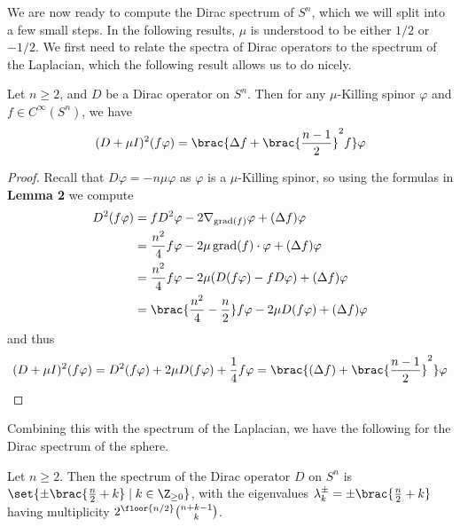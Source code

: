 \documentclass[11pt]{report}
\DeclareMathOperator{\grad}{grad}
\begin{document}
We are now ready to compute the Dirac spectrum of $S^n$, which we will split into a few small steps. In the following results, $\mu$ is understood to be either $1/2$ or $-1/2$. We first need to relate the spectra of Dirac operators to the spectrum of the Laplacian, which the following result allows us to do nicely.
\begin{lemma}
    Let $n \geq 2$, and $D$ be a Dirac operator on $S^n$. Then for any $\mu$-Killing spinor $\varphi$ and $f \in C^\infty(S^n)$, we have
    $$
        (D + \mu I)^2(f\varphi) = \brac{\Delta f + \brac{\frac{n - 1}{2}}^2 f}\varphi
    $$
\end{lemma}
\begin{proof}
    Recall that $D\varphi = -n\mu\varphi$ as $\varphi$ is a $\mu$-Killing spinor, so using the formulas in \textbf{Lemma 2} we compute
    \begin{align*}
        D^2(f\varphi) &= fD^2\varphi - 2\nabla_{\grad(f)}\varphi + (\Delta f)\varphi \\
        &= \frac{n^2}{4}f\varphi - 2\mu \grad(f) \cdot \varphi + (\Delta f)\varphi \\
        &= \frac{n^2}{4}f\varphi - 2\mu(D(f\varphi) - fD\varphi) + (\Delta f)\varphi \\
        &= \brac{\frac{n^2}{4} - \frac{n}{2}}f\varphi - 2\mu D(f\varphi) + (\Delta f)\varphi
    \end{align*}
    and thus
    $$
        (D + \mu I)^2(f\varphi) = D^2(f\varphi) + 2\mu D(f\varphi) + \frac14f\varphi = \brac{(\Delta f) + \brac{\frac{n - 1}{2}}^2}\varphi
    $$
\end{proof} Combining this with the spectrum of the Laplacian, we have the following for the Dirac spectrum of the sphere.
\begin{theorem}
    Let $n \geq 2$. Then the spectrum of the Dirac operator $D$ on $S^n$ is $\set{\pm\brac{\frac n2 + k} \mid k \in \Z_{\geq 0}}$, with the eigenvalues $\lambda_k^\pm = \pm\brac{\frac{n}{2} + k}$ having multiplicity $2^{\floor{n/2}}{n + k - 1 \choose k}$.
\end{theorem}
\end{document}
